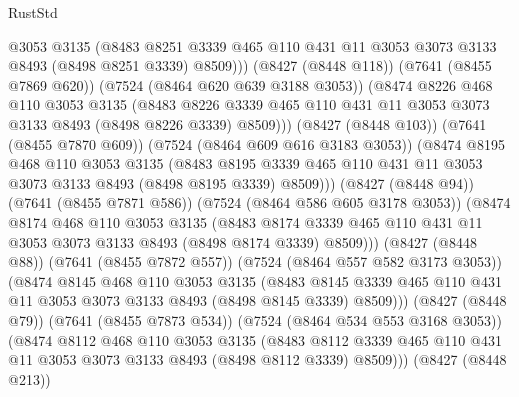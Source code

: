 \begin{lexlean}{RustStd}
\begin{coremodule}
                  @3053
                  @3135
                  (@8483
                    @8251
                    @3339
                    @465
                    @110
                    @431
                    @11
                    @3053
                    @3073
                    @3133
                    @8493
                    (@8498 @8251 @3339)
                    @8509)))
              (@8427 (@8448 @118))
              (@7641 (@8455 @7869 @620))
              (@7524 (@8464 @620 @639 @3188 @3053))
              (@8474
                @8226
                @468
                @110
                @3053
                @3135
                (@8483
                  @8226
                  @3339
                  @465
                  @110
                  @431
                  @11
                  @3053
                  @3073
                  @3133
                  @8493
                  (@8498 @8226 @3339)
                  @8509)))
            (@8427 (@8448 @103))
            (@7641 (@8455 @7870 @609))
            (@7524 (@8464 @609 @616 @3183 @3053))
            (@8474
              @8195
              @468
              @110
              @3053
              @3135
              (@8483
                @8195
                @3339
                @465
                @110
                @431
                @11
                @3053
                @3073
                @3133
                @8493
                (@8498 @8195 @3339)
                @8509)))
          (@8427 (@8448 @94))
          (@7641 (@8455 @7871 @586))
          (@7524 (@8464 @586 @605 @3178 @3053))
          (@8474
            @8174
            @468
            @110
            @3053
            @3135
            (@8483
              @8174
              @3339
              @465
              @110
              @431
              @11
              @3053
              @3073
              @3133
              @8493
              (@8498 @8174 @3339)
              @8509)))
        (@8427 (@8448 @88))
        (@7641 (@8455 @7872 @557))
        (@7524 (@8464 @557 @582 @3173 @3053))
        (@8474
          @8145
          @468
          @110
          @3053
          @3135
          (@8483 @8145 @3339 @465 @110 @431 @11 @3053 @3073 @3133 @8493 (@8498 @8145 @3339) @8509)))
      (@8427 (@8448 @79))
      (@7641 (@8455 @7873 @534))
      (@7524 (@8464 @534 @553 @3168 @3053))
      (@8474
        @8112
        @468
        @110
        @3053
        @3135
        (@8483 @8112 @3339 @465 @110 @431 @11 @3053 @3073 @3133 @8493 (@8498 @8112 @3339) @8509)))
    (@8427 (@8448 @213))

\end{coremodule}
\end{lexlean}
